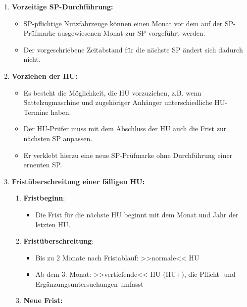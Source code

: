 \documentclass{vorlage-design-main}
\begin{document}
\begin{enumerate}
\def\labelenumi{\arabic{enumi}.}

\item
  \textbf{Vorzeitige SP-Durchführung:}

  \begin{itemize}
  
  \item
    SP-pflichtige Nutzfahrzeuge können einen Monat vor dem auf der
    SP-Prüfmarke ausgewiesenen Monat zur SP vorgeführt werden.
  \item
    Der vorgeschriebene Zeitabstand für die nächste SP ändert sich
    dadurch nicht.
  \end{itemize}
\item
  \textbf{Vorziehen der HU:}

  \begin{itemize}
  
  \item
    Es besteht die Möglichkeit, die HU vorzuziehen, z.B. wenn
    Sattelzugmaschine und zugehöriger Anhänger unterschiedliche
    HU-Termine haben.
  \item
    Der HU-Prüfer muss mit dem Abschluss der HU auch die Frist zur
    nächsten SP anpassen.
  \item
    Er verklebt hierzu eine neue SP-Prüfmarke ohne Durchführung einer
    erneuten SP.
  \end{itemize}
\item
  \textbf{Fristüberschreitung einer fälligen HU:}

  \begin{enumerate}
  \def\labelenumii{\arabic{enumii}.}
  
  \item
    \textbf{Fristbeginn}:

    \begin{itemize}
    
    \item
      Die Frist für die nächste HU beginnt mit dem Monat und Jahr der
      letzten HU.
    \end{itemize}
  \item
    \textbf{Fristüberschreitung}:

    \begin{itemize}
    
    \item
      Bis zu 2 Monate nach Fristablauf: >>normale<< HU
    \item
      Ab dem 3. Monat: >>vertiefende<< HU (HU+), die Pflicht- und
      Ergänzungsuntersuchungen umfasst
    \end{itemize}
  \item
    \textbf{Neue Frist:}


\end{enumerate}
\end{enumerate}
\end{document}
